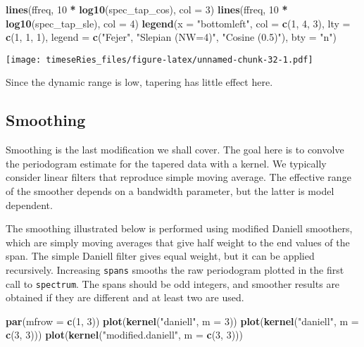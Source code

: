 \documentclass[]{book}
\newenvironment{Shaded}{\begin{snugshade}}{\end{snugshade}}
\newcommand{\KeywordTok}[1]{\textcolor[rgb]{0.13,0.29,0.53}{\textbf{#1}}}
\newcommand{\DataTypeTok}[1]{\textcolor[rgb]{0.13,0.29,0.53}{#1}}
\newcommand{\DecValTok}[1]{\textcolor[rgb]{0.00,0.00,0.81}{#1}}
\newcommand{\StringTok}[1]{\textcolor[rgb]{0.31,0.60,0.02}{#1}}
\newcommand{\OperatorTok}[1]{\textcolor[rgb]{0.81,0.36,0.00}{\textbf{#1}}}
\newcommand{\NormalTok}[1]{#1}
\begin{document}
\begin{Shaded}
\begin{Highlighting}[]
\KeywordTok{lines}\NormalTok{(ffreq, }\DecValTok{10} \OperatorTok{*}\StringTok{ }\KeywordTok{log10}\NormalTok{(spec_tap_cos), }\DataTypeTok{col =} \DecValTok{3}\NormalTok{)}
\KeywordTok{lines}\NormalTok{(ffreq, }\DecValTok{10} \OperatorTok{*}\StringTok{ }\KeywordTok{log10}\NormalTok{(spec_tap_sle), }\DataTypeTok{col =} \DecValTok{4}\NormalTok{)}
\KeywordTok{legend}\NormalTok{(}\DataTypeTok{x =} \StringTok{"bottomleft"}\NormalTok{, }\DataTypeTok{col =} \KeywordTok{c}\NormalTok{(}\DecValTok{1}\NormalTok{, }\DecValTok{4}\NormalTok{, }\DecValTok{3}\NormalTok{), }\DataTypeTok{lty =} \KeywordTok{c}\NormalTok{(}\DecValTok{1}\NormalTok{, }\DecValTok{1}\NormalTok{, }\DecValTok{1}\NormalTok{), }\DataTypeTok{legend =} \KeywordTok{c}\NormalTok{(}\StringTok{"Fejer"}\NormalTok{, }
    \StringTok{"Slepian (NW=4)"}\NormalTok{, }\StringTok{"Cosine (0.5)"}\NormalTok{), }\DataTypeTok{bty =} \StringTok{"n"}\NormalTok{)}
\end{Highlighting}
\end{Shaded}

\texttt{[image: timeseRies\_files/figure-latex/unnamed-chunk-32-1.pdf]}

Since the dynamic range is low, tapering has little effect here.

\subsection{Smoothing}\label{smoothing}

Smoothing is the last modification we shall cover. The goal here is to
convolve the periodogram estimate for the tapered data with a kernel. We
typically consider linear filters that reproduce simple moving average.
The effective range of the smoother depends on a bandwidth parameter,
but the latter is model dependent.

The smoothing illustrated below is performed using modified Daniell
smoothers, which are simply moving averages that give half weight to the
end values of the span. The simple Daniell filter gives equal weight,
but it can be applied recursively. Increasing \texttt{spans} smooths the
raw periodogram plotted in the first call to \texttt{spectrum}. The
spans should be odd integers, and smoother results are obtained if they
are different and at least two are used.

\begin{Shaded}
\begin{Highlighting}[]
\KeywordTok{par}\NormalTok{(}\DataTypeTok{mfrow =} \KeywordTok{c}\NormalTok{(}\DecValTok{1}\NormalTok{, }\DecValTok{3}\NormalTok{))}
\KeywordTok{plot}\NormalTok{(}\KeywordTok{kernel}\NormalTok{(}\StringTok{"daniell"}\NormalTok{, }\DataTypeTok{m =} \DecValTok{3}\NormalTok{))}
\KeywordTok{plot}\NormalTok{(}\KeywordTok{kernel}\NormalTok{(}\StringTok{"daniell"}\NormalTok{, }\DataTypeTok{m =} \KeywordTok{c}\NormalTok{(}\DecValTok{3}\NormalTok{, }\DecValTok{3}\NormalTok{)))}
\KeywordTok{plot}\NormalTok{(}\KeywordTok{kernel}\NormalTok{(}\StringTok{"modified.daniell"}\NormalTok{, }\DataTypeTok{m =} \KeywordTok{c}\NormalTok{(}\DecValTok{3}\NormalTok{, }\DecValTok{3}\NormalTok{)))}
\end{Highlighting}
\end{Shaded}
\end{document}
